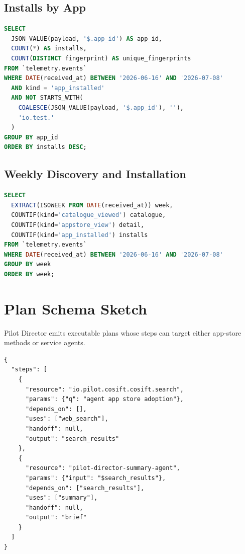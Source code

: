 \documentclass[10pt,twocolumn]{article}
\newcommand{\director}{Pilot Director}
\begin{document}
\subsection{Installs by App}

\begin{lstlisting}[language=SQL]
SELECT
  JSON_VALUE(payload, '$.app_id') AS app_id,
  COUNT(*) AS installs,
  COUNT(DISTINCT fingerprint) AS unique_fingerprints
FROM `telemetry.events`
WHERE DATE(received_at) BETWEEN '2026-06-16' AND '2026-07-08'
  AND kind = 'app_installed'
  AND NOT STARTS_WITH(
    COALESCE(JSON_VALUE(payload, '$.app_id'), ''),
    'io.test.'
  )
GROUP BY app_id
ORDER BY installs DESC;
\end{lstlisting}

\subsection{Weekly Discovery and Installation}

\begin{lstlisting}[language=SQL]
SELECT
  EXTRACT(ISOWEEK FROM DATE(received_at)) week,
  COUNTIF(kind='catalogue_viewed') catalogue,
  COUNTIF(kind='appstore_view') detail,
  COUNTIF(kind='app_installed') installs
FROM `telemetry.events`
WHERE DATE(received_at) BETWEEN '2026-06-16' AND '2026-07-08'
GROUP BY week
ORDER BY week;
\end{lstlisting}

\section{Plan Schema Sketch}
\label{app:plan-schema}

\director{} emits executable plans whose steps can target either app-store methods or service agents.

\begin{lstlisting}
{
  "steps": [
    {
      "resource": "io.pilot.cosift.cosift.search",
      "params": {"q": "agent app store adoption"},
      "depends_on": [],
      "uses": ["web_search"],
      "handoff": null,
      "output": "search_results"
    },
    {
      "resource": "pilot-director-summary-agent",
      "params": {"input": "$search_results"},
      "depends_on": ["search_results"],
      "uses": ["summary"],
      "handoff": null,
      "output": "brief"
    }
  ]
}
\end{lstlisting}
\end{document}
